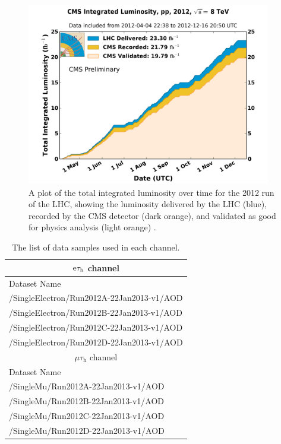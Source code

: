 \documentclass[12pt]{thesis}  %
\newcommand{\tauh}{\ensuremath{\tau_{\text{h}}}\xspace}
\newcommand{\Pe}{\ensuremath{\cmsSymbolFace{e}}\xspace}
\newcommand{\mutau}{\ensuremath{\mu\tauh}\xspace}
\newcommand{\etau}{\ensuremath{\Pe\tauh}\xspace}
\begin{document}
\begin{figure}[hbt]
\begin{center}
\includegraphics[width=0.95\textwidth]{figures/int_lumi_per_day_cumulative_pp_2012_SummerConf.png}
\caption{A plot of the total integrated luminosity over time for the 2012 run of the LHC, showing the luminosity delivered by the LHC (blue), recorded by the CMS detector (dark orange), and validated as good for physics analysis (light orange) \cite{DataQuality}.}
\label{fig:lumipublic-dqm}
\end{center}
\end{figure}

\begin{table}[hbt]
\begin{center}
\begin{tabular}{|l|}
\multicolumn{1}{c}{$\etau$ channel} \\
\hline
Dataset Name \\
\hline
/SingleElectron/Run2012A-22Jan2013-v1/AOD \\
/SingleElectron/Run2012B-22Jan2013-v1/AOD \\
/SingleElectron/Run2012C-22Jan2013-v1/AOD \\
/SingleElectron/Run2012D-22Jan2013-v1/AOD \\
\hline
\multicolumn{1}{c}{$\mutau$ channel} \\ 
\hline
Dataset Name \\
\hline
/SingleMu/Run2012A-22Jan2013-v1/AOD \\
/SingleMu/Run2012B-22Jan2013-v1/AOD \\
/SingleMu/Run2012C-22Jan2013-v1/AOD \\
/SingleMu/Run2012D-22Jan2013-v1/AOD \\
\hline
\end{tabular}
\caption{The list of data samples used in each channel.}
\label{tab:data-samples}
\end{center}
\end{table}
\end{document}
